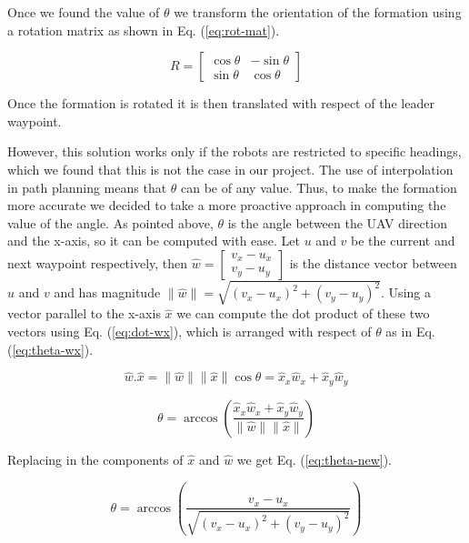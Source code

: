 Once we found the value of $\theta$ we transform the orientation of the formation using a rotation matrix
as shown in Eq. (\ref{eq:rot-mat}).

\begin{equation}
	R = \begin{bmatrix} \cos \theta & -\sin \theta \\ \sin \theta & \cos \theta \end{bmatrix}
	\label{eq:rot-mat}
\end{equation}

Once the formation is rotated it is then translated with respect of the leader waypoint.

However, this solution works only if the robots are restricted to specific headings, which
we found that this is not the case in our project. The use of interpolation in path planning
means that $\theta$ can be of any value. Thus, to make the formation more accurate we decided
to take a more proactive approach in computing the value of the angle. As pointed above, $\theta$ 
is the angle between the UAV direction and the x-axis, so it can be computed with ease.
Let $u$ and $v$ be the current and next waypoint respectively, then 
$\hat{w} = \begin{bmatrix} v_x - u_x \\ v_y - u_y \end{bmatrix}$ is the distance vector between
$u$ and $v$ and has magnitude $\parallel \hat{w} \parallel = \sqrt{(v_x - u_x)^2 + (v_y - u_y)^2}$.
Using a vector parallel to the x-axis $\hat{x}$ we can compute the dot product of these two vectors
using Eq. (\ref{eq:dot-wx}), which is arranged with respect of $\theta$ as in Eq. (\ref{eq:theta-wx}).

\begin{equation}
	\hat{w} . \hat{x} = \parallel \hat{w} \parallel \parallel \hat{x} \parallel \cos \theta = \hat{x}_x \hat{w}_x + \hat{x}_y \hat{w}_y
	\label{eq:dot-wx}
\end{equation}

\begin{equation}
	\theta = \arccos \left(\frac{\hat{x}_x \hat{w}_x + \hat{x}_y \hat{w}_y}{\parallel \hat{w} \parallel \parallel \hat{x} \parallel}\right)
	\label{eq:theta-wx}
\end{equation}

Replacing in the components of $\hat{x}$ and $\hat{w}$ we get Eq. (\ref{eq:theta-new}). 

\begin{equation}
	\theta = \arccos \left(\frac{v_x - u_x}{\sqrt{(v_x - u_x)^2 + (v_y - u_y)^2}}\right)
	\label{eq:theta-new}
\end{equation}

